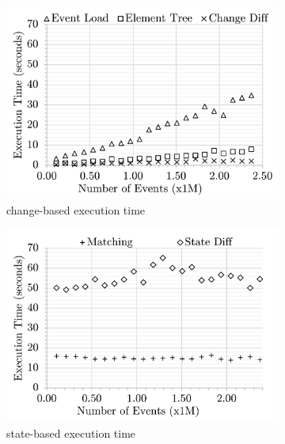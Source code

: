 \documentclass{jot}
\begin{document}
\begin{figure}[ht]
    \centering
    \begin{subfigure}[t]{0.495\linewidth}
        \includegraphics[width=\linewidth]{mixed-time-events-detail}
        \caption{change-based execution time}
        \label{fig:time_changediff_detail}
    \end{subfigure}
    \hfill
    \begin{subfigure}[t]{0.495\linewidth}
        \includegraphics[width=\linewidth]{state-time-events-detail}
        \caption{state-based execution time}
        \label{fig:time_statediff_detail}
    \end{subfigure}
    \begin{subfigure}[t]{0.495\linewidth}

\end{subfigure}
\end{figure}
\end{document}
